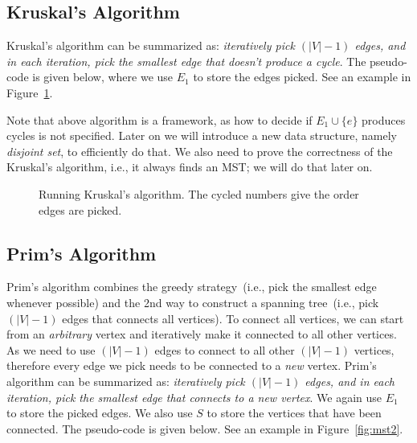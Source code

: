 \subsection*{Kruskal's Algorithm}

Kruskal's algorithm can be summarized as: \emph{iteratively pick $(|V|-1)$ edges,
and in each iteration, pick the smallest edge that doesn't produce a cycle}.
The pseudo-code is given below, where we use $E_1$ to store
the edges picked. See an example in Figure~\ref{fig:mst1}.

\begin{minipage}{0.8\textwidth}
	\xxx
	\xxx
	\xxx
	\xxx
	\xxx
	\xxx
	\xxx
	\xxx
	\xxx
	\xxx
\end{minipage}

Note that above algorithm is a framework, as how to decide if $E_1\cup\{e\}$
produces cycles is not specified. Later on we will introduce a new data
structure, namely \emph{disjoint set}, to efficiently do that.
We also need to prove the correctness of the Kruskal's algorithm, i.e.,
it always finds an MST; we will do that later on.

\begin{figure}[h]
\centering{}
\caption{Running Kruskal's algorithm. The cycled numbers give the order edges are picked.}
\label{fig:mst1}
\end{figure}

\subsection*{Prim's Algorithm}

Prim's algorithm combines the greedy strategy~(i.e., pick the smallest edge whenever possible)
and the 2nd way to construct a spanning tree~(i.e., pick $(|V|-1)$ edges that connects all vertices).
To connect all vertices, we can start from an \emph{arbitrary} vertex and iteratively
make it connected to all other vertices. As we need to use $(|V| - 1)$ edges to connect
to all other $(|V|-1)$ vertices, therefore every edge we pick needs to be connected to a
\emph{new} vertex.
Prim's algorithm can be summarized as: \emph{iteratively pick $(|V|-1)$ edges,
and in each iteration, pick the smallest edge that connects to a new vertex}.
We again use $E_1$ to store the picked edges.
We also use $S$ to store the vertices that have been connected.
The pseudo-code is given below.  See an example in Figure~\ref{fig:mst2}.

